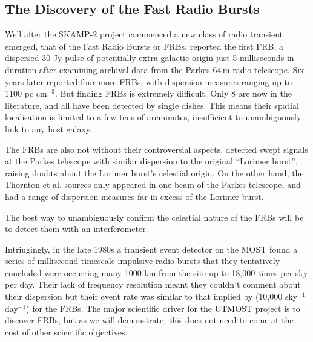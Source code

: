 \subsection{The Discovery of the Fast Radio Bursts}

Well after the SKAMP-2 project commenced a new class of radio transient emerged, that of the Fast Radio Bursts or FRBs. \cite{Lorimer_2007} reported the first FRB, a dispersed 30-Jy pulse of potentially extra-galactic origin just 5 milliseconds in duration after examining archival data from the Parkes 64\,m radio telescope. Six years later \citep{Thornton_2013} reported four more FRBs, with dispersion measures ranging up to 1100 pc cm$^{-3}$. But finding FRBs is extremely difficult. Only 8 are now in the literature, and all have been detected by single dishes. This means their spatial localisation is limited to a few tens of arcminutes, insufficient to unambiguously link to any host galaxy.

The FRBs are also not without their controversial aspects. \cite{Burke_Spolaor_2011} detected swept signals at the Parkes telescope with similar dispersion to the original ``Lorimer burst'', raising doubts about the Lorimer burst's celestial origin. On the other hand, the Thornton et al. sources only appeared in one beam of the Parkes telescope, and had a range of dispersion measures far in excess of the Lorimer burst.

The best way to unambiguously confirm the celestial nature of the FRBs will be to detect them with an interferometer.

 Intriugingly, in the late 1980s a transient event detector on the MOST found a series of millisecond-timescale impulsive radio bursts that they tentatively concluded were occurring many 1000 km from the site up to 18,000 times per sky per day\cite{AMY}. Their lack of frequency resolution meant they couldn't comment about their dispersion but their event rate was similar to that implied by \citep{Thornton_2013} (10,000 sky$^{-1}$ day$^{-1}$) for the FRBs. The major scientific driver for the UTMOST project is to discover FRBs, but as we will demonstrate, this does not need to come at the cost of other scientific objectives.
